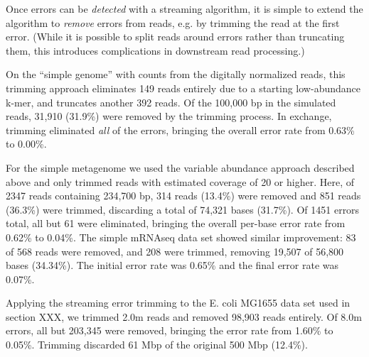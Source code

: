 \documentclass{article}
\begin{document}
Once errors can be {\em detected} with a streaming algorithm, it is
simple to extend the algorithm to {\em remove} errors from reads,
e.g. by trimming the read at the first error.  (While it is possible
to split reads around errors rather than truncating them, this
introduces complications in downstream read processing.)


On the ``simple genome'' with counts from the digitally normalized
reads, this trimming approach eliminates 149 reads entirely due to a
starting low-abundance k-mer, and truncates another 392 reads.  Of the
100,000 bp in the simulated reads, 31,910 (31.9\%) were removed by the
trimming process.  In exchange, trimming eliminated {\em all} of the
errors, bringing the overall error rate from 0.63\% to 0.00\%.


For the simple metagenome we used the variable abundance approach
described above and only trimmed reads with estimated coverage of 20
or higher.  Here, of 2347 reads containing 234,700 bp, 314 reads
(13.4\%) were removed and 851 reads (36.3\%) were trimmed, discarding
a total of 74,321 bases (31.7\%).  Of 1451 errors total, all but 61
were eliminated, bringing the overall per-base error rate from 0.62\% to
0.04\%.  The simple mRNAseq data set showed similar improvement: 83 of
568 reads were removed, and 208 were trimmed, removing 19,507 of
56,800 bases (34.34\%).  The initial error rate was 0.65\% and the
final error rate was 0.07\%.



%

Applying the streaming error trimming to the E. coli MG1655 data set
used in section XXX, we trimmed 2.0m reads and removed 98,903
reads entirely.  Of 8.0m errors, all but 203,345 were removed,
bringing the error rate from 1.60\% to 0.05\%.  Trimming discarded 61
Mbp of the original 500 Mbp (12.4\%).
\end{document}
